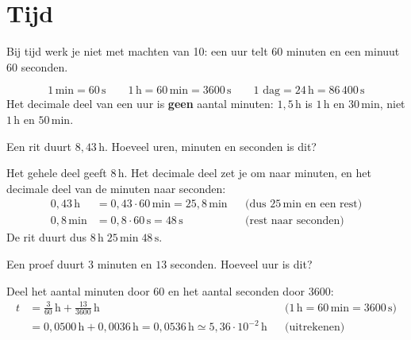 \documentclass{ximera}
\begin{document}
\section{Tijd}\label{sec:tijd_omzetten}
Bij tijd werk je niet met machten van 10: een uur telt 60 minuten en een minuut 60 seconden.

\begin{proposition}[title={Omzetten van tijd}]\nl
    \[ 1 \, \mathrm{min} = 60 \, \mathrm{s} \qquad 1 \, \mathrm{h} = 60 \, \mathrm{min} = 3600 \, \mathrm{s} \qquad 1 \text{ dag} = 24 \, \mathrm{h} = 86\,400 \, \mathrm{s} \]
    Het decimale deel van een uur is \textbf{geen} aantal minuten: $1{,}5 \, \mathrm{h}$ is $1 \, \mathrm{h}$ en $30 \, \mathrm{min}$, niet $1 \, \mathrm{h}$ en $50 \, \mathrm{min}$.
\end{proposition}

\begin{example}[foldable=true,title={Voorbeeld: decimale uren naar uren, minuten en seconden}]\nl
    Een rit duurt $8{,}43 \, \mathrm{h}$. Hoeveel uren, minuten en seconden is dit?

    \begin{solution}\nl
        Het gehele deel geeft $8 \, \mathrm{h}$. Het decimale deel zet je om naar minuten, en het decimale deel van de minuten naar seconden:
        \begin{align*}
            0{,}43 \, \mathrm{h} &= 0{,}43 \cdot 60 \, \mathrm{min} = 25{,}8 \, \mathrm{min} && \text{(dus $25 \, \mathrm{min}$ en een rest)}\\
            0{,}8 \, \mathrm{min} &= 0{,}8 \cdot 60 \, \mathrm{s} = 48 \, \mathrm{s} && \text{(rest naar seconden)}
        \end{align*}
        De rit duurt dus $\boxed{8 \, \mathrm{h} \; 25 \, \mathrm{min} \; 48 \, \mathrm{s}}$.
    \end{solution}
\end{example}

\begin{example}[foldable=true,title={Voorbeeld: minuten en seconden naar uur}]\nl
    Een proef duurt $3$ minuten en $13$ seconden. Hoeveel uur is dit?

    \begin{solution}\nl
        Deel het aantal minuten door 60 en het aantal seconden door 3600:
        \begin{align*}
            t &= \frac{3}{60} \, \mathrm{h} + \frac{13}{3600} \, \mathrm{h} && \text{($1 \, \mathrm{h} = 60 \, \mathrm{min} = 3600 \, \mathrm{s}$)}\\
            &= 0{,}0500 \, \mathrm{h} + 0{,}0036 \, \mathrm{h} = 0{,}0536 \, \mathrm{h} \simeq \boxed{5{,}36 \cdot 10^{-2} \, \mathrm{h}} && \text{(uitrekenen)}
        \end{align*}
    \end{solution}
\end{example}
\end{document}
